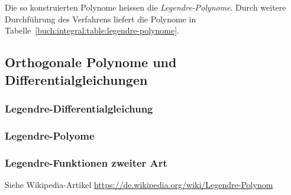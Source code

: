 Die so konstruierten Polynome heissen die {\em Legendre-Polynome}.
Durch weitere Durchführung des Verfahrens liefert die Polynome in
Tabelle~\ref{buch:integral:table:legendre-polynome}.


%
%
\subsection{Orthogonale Polynome und Differentialgleichungen}
\subsubsection{Legendre-Differentialgleichung}
\subsubsection{Legendre-Polyome}
\subsubsection{Legendre-Funktionen zweiter Art}
Siehe Wikipedia-Artikel \url{https://de.wikipedia.org/wiki/Legendre-Polynom}

